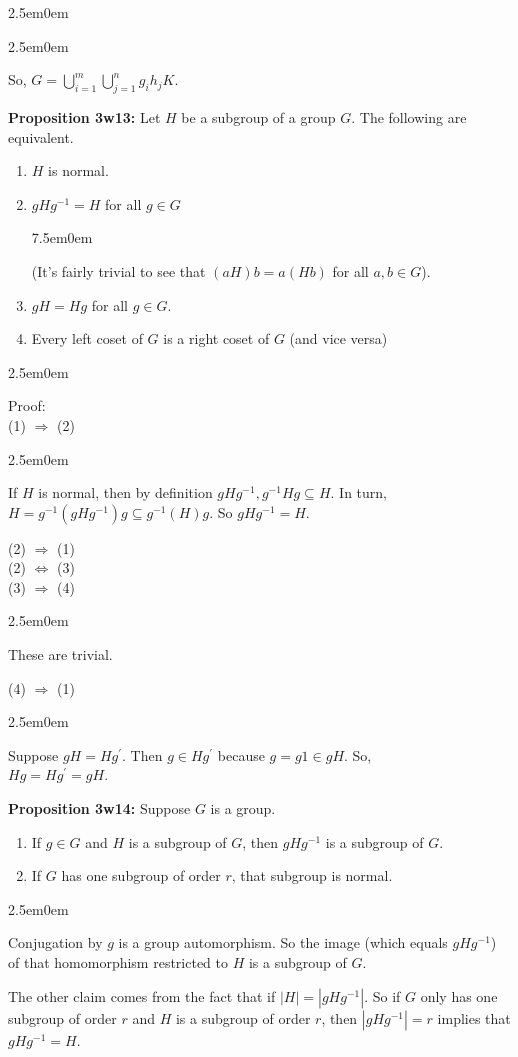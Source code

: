 \documentclass{book}
\newcommand{\hThree}{%
   \color{PineGreen!85!Orange}
   \fontsize{12}{14}\selectfont%
}
\newcommand{\myComment}{%
   \color{RawerSienna}%
   \fontsize{12}{14}\selectfont%
}
\newenvironment{myIndent}{%
   \begin{adjustwidth}{2.5em}{0em}%
}{%
   \end{adjustwidth}%
}
\newenvironment{myTindent}{%
   \begin{adjustwidth}{7.5em}{0em}%
}{%
   \end{adjustwidth}%
}
\newcommand{\blab}[1]{\textbf{#1}}
\newcommand{\retTwo}{\hfill\bigbreak}
\begin{document}
\begin{myIndent}
\begin{myIndent}
		So, $G = \bigcup\limits_{i=1}^m \bigcup\limits_{j=1}^n g_ih_j K$.\retTwo
	\end{myIndent}

	\blab{Proposition 3w13:} Let $H$ be a subgroup of a group $G$. The following are equivalent.
	\begin{enumerate}
		\item $H$ is normal.
		\item $gHg^{-1} = H$ for all $g \in G$
		\begin{myTindent}
			{\myComment (It's fairly trivial to see that $(aH)b = a(Hb)$ for all $a, b\in G$).}
		\end{myTindent}
		\item $gH = Hg$ for all $g \in G$.
		\item Every left coset of $G$ is a right coset of $G$ (and vice versa)
	\end{enumerate}

	\begin{myIndent}\hThree
		Proof:\\
		(1) $\Longrightarrow$ (2) 
		\begin{myIndent}
			If $H$ is normal, then by definition $gHg^{-1}, g^{-1}Hg \subseteq H$. In turn,\\ $H = g^{-1}(gHg^{-1})g \subseteq g^{-1}(H)g$. So $gHg^{-1} = H$.\retTwo
		\end{myIndent}

		(2) $\Longrightarrow$ (1)\\
		(2) $\Longleftrightarrow$ (3)\\
		(3) $\Longrightarrow$ (4)
		\begin{myIndent}
			These are trivial.\retTwo
		\end{myIndent}

		(4) $\Longrightarrow$ (1)
		\begin{myIndent}
			Suppose $gH = Hg^\prime$. Then $g \in Hg^\prime$ because $g = g1 \in gH$. So,\\ $Hg = Hg^\prime = gH$.\retTwo
		\end{myIndent}
	\end{myIndent}

	\blab{Proposition 3w14:} Suppose $G$ is a group.
	\begin{enumerate}
		\item If $g \in G$ and $H$ is a subgroup of $G$, then $gHg^{-1}$ is a subgroup of $G$.
		\item If $G$ has one subgroup of order $r$, that subgroup is normal.
	\end{enumerate}

	\begin{myIndent}\hThree
		Conjugation by $g$ is a group automorphism. So the image (which equals $gHg^{-1}$) of that homomorphism restricted to $H$ is a subgroup of $G$.\retTwo

		The other claim comes from the fact that if $|H| = |gHg^{-1}|$. So if $G$ only has one subgroup of order $r$ and $H$ is a subgroup of order $r$, then $|gHg^{-1}| = r$ implies that $gHg^{-1} = H$.\newpage
	\end{myIndent}
\end{myIndent}
\end{document}

